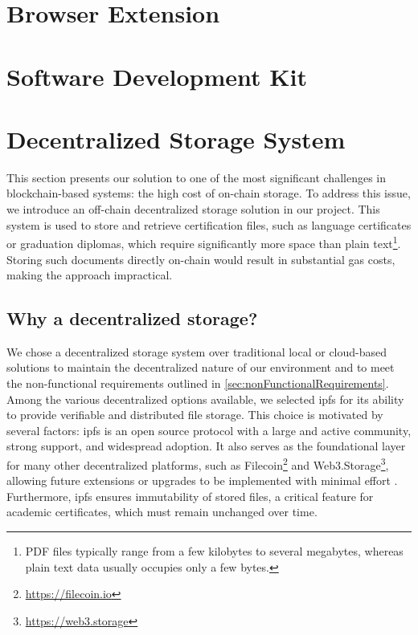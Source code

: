 \section{Browser Extension}
\label{sec:browserExtensionDesign}

\section{Software Development Kit}
\label{sec:sdkDesign}

\section{Decentralized Storage System}
\label{sec:decStorageDesgn}
This section presents our solution to one of the most significant challenges in blockchain-based systems: the high cost of on-chain storage. To address this issue, we introduce an off-chain decentralized storage solution in our project. This system is used to store and retrieve certification files, such as language certificates or graduation diplomas, which require significantly more space than plain text\footnote{PDF files typically range from a few kilobytes to several megabytes, whereas plain text data usually occupies only a few bytes.}. Storing such documents directly on-chain would result in substantial gas costs, making the approach impractical. 

\subsection{Why a decentralized storage?}
We chose a decentralized storage system over traditional local or cloud-based solutions to maintain the decentralized nature of our environment and to meet the non-functional requirements outlined in \cref{sec:nonFunctionalRequirements}. Among the various decentralized options available, we selected \acrfull{ipfs} for its ability to provide verifiable and distributed file storage. This choice is motivated by several factors: \acrshort{ipfs} is an open source protocol with a large and active community, strong support, and widespread adoption. It also serves as the foundational layer for many other decentralized platforms, such as Filecoin\footnote{\url{https://filecoin.io}} and Web3.Storage\footnote{\url{https://web3.storage}}, allowing future extensions or upgrades to be implemented with minimal effort \cite{erikflorian2022ipfsandfrineds}. Furthermore, \acrshort{ipfs} ensures immutability of stored files, a critical feature for academic certificates, which must remain unchanged over time.

